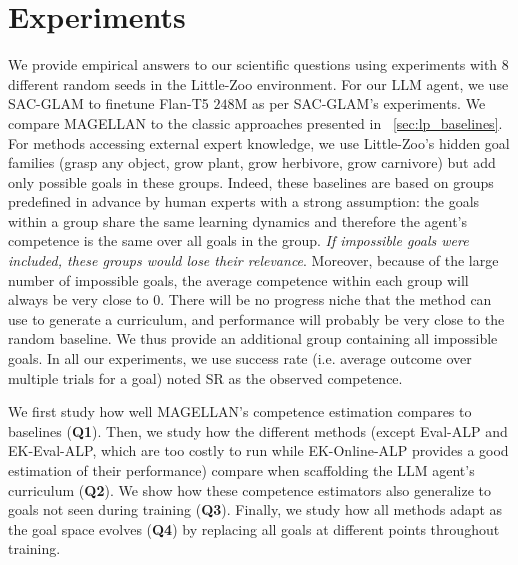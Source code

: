 \documentclass{article}
\begin{document}
\section{Experiments}
\label{sec:experiments}
We provide empirical answers to our scientific questions using experiments with 8 different random seeds in the Little-Zoo environment. For our LLM agent, we use SAC-GLAM \cite{gaven2024sacglam} to finetune Flan-T5 $248$M \cite{raffel_exploring_2020} as per SAC-GLAM's experiments. We compare MAGELLAN to the classic approaches presented in ~\ref{sec:lp_baselines}. For methods accessing external expert knowledge, we use Little-Zoo's hidden goal families (grasp any object, grow plant, grow herbivore, grow carnivore) but add only possible goals in these groups. Indeed, these baselines are based on groups predefined in advance by human experts with a strong assumption: the goals within a group share the same learning dynamics and therefore the agent’s competence is the same over all goals in the group. \textit{If impossible goals were included, these groups would lose their relevance}. Moreover, because of the large number of impossible goals, the average competence within each group will always be very close to 0. There will be no progress niche that the method can use to generate a curriculum, and performance will probably be very close to the random baseline. We thus provide an additional group containing all impossible goals. In all our experiments, we use success rate (i.e. average outcome over multiple trials for a goal) noted SR as the observed competence.

We first study how well MAGELLAN's competence estimation compares to baselines (\textbf{Q1}). Then, we study how the different methods (except Eval-ALP and EK-Eval-ALP, which are too costly to run while EK-Online-ALP provides a good estimation of their performance) compare when scaffolding the LLM agent's curriculum (\textbf{Q2}). We show how these competence estimators also generalize to goals not seen during training (\textbf{Q3}). Finally, we study how all methods adapt as the goal space evolves (\textbf{Q4}) by replacing all goals at different points throughout training.

\end{document}
